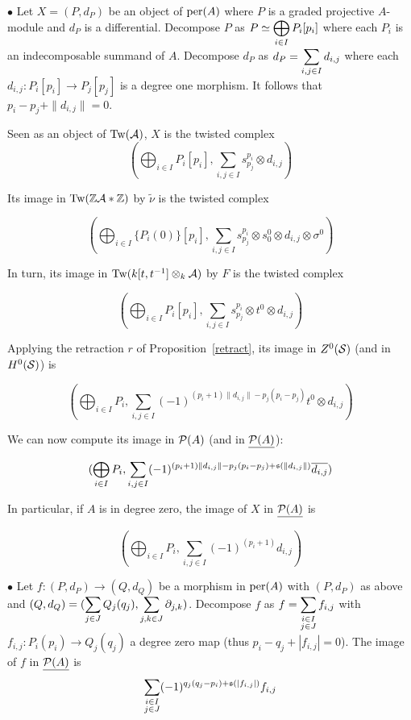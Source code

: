 \documentclass[12pt]{article}
\begin{document}
	\noindent $\bullet $ Let $X=(P,d_P)$ be an object of $\textup{per}(A)$ where $P$ is a graded projective $A$-module and $d_P$ is a differential. Decompose $P$ as $P\simeq \displaystyle\bigoplus_{i \in I} P_i[p_i]$ where each $P_i$ is an indecomposable summand of $A$. Decompose $d_P$ as $d_P= \displaystyle\sum_{i,j \in I} d_{i,j}$ where each $d_{i,j}: P_i[p_i] \to P_j[p_j]$ is a degree one morphism. It follows that $p_i-p_j + \|d_{i,j}\| = 0$.
	
	\noindent Seen as an object of $\textup{Tw}({\cal{A}})$, $X$ is the twisted complex
	\[(\bigoplus_{i \in I} P_i[p_i], \sum_{i,j \in I} s^{p_i}_{p_j} \otimes d_{i,j})\]
	
	\noindent Its image in $\textup{Tw}(\mathbb{Z} {\cal{A}} * \mathbb{Z})$ by $\tilde{\nu}$ is the twisted complex
	
	\[(\bigoplus_{i \in I} \{P_i(0)\}[p_i], \sum_{i,j \in I} s^{p_i}_{p_j} \otimes s^0_0 \otimes d_{i,j} \otimes \sigma^0)\]
	
	\noindent In turn, its image in $\textup{Tw}(k[t,t^{-1}] \otimes_k {\cal{A}})$ by $F$ is the twisted complex
	
	\[(\bigoplus_{i \in I} P_i[p_i], \sum_{i,j \in I} s^{p_i}_{p_j} \otimes t^0 \otimes d_{i,j})\]
	
	\noindent Applying the retraction $r$ of Proposition~\ref{retract}, its image in $Z^0({\cal{S}})$ (and in $H^0({\cal{S}})$) is
	
	\[(\bigoplus_{i \in I} P_i, \sum_{i,j \in I} (-1)^{(p_i+1)\|d_{i,j}\| - p_j(p_i-p_j)} t^0 \otimes d_{i,j} )\]
	
	\noindent We can now compute its image in ${\cal{P}}(A)$ (and in $\underline{{\cal{P}}(A)}$):
	
	\[(\bigoplus_{i \in I} P_i, \sum_{i,j \in I} (-1)^{(p_i+1)\|d_{i,j}\| - p_j(p_i-p_j) + \mathfrak{s}(\|d_{i,j}\|)} \overline{d_{i,j}})\]
	
	\noindent In particular, if $A$ is in degree zero, the image of $X$ in $\underline{{\cal{P}}(A)}$ is
	
	\[(\bigoplus_{i \in I} P_i, \sum_{i,j \in I} (-1)^{(p_i+1)} d_{i,j})\]
	
	\noindent $\bullet$ Let $f: (P,d_P) \to (Q,d_Q)$ be a morphism in $\textup{per}(A)$ with $(P,d_P)$ as above and $(Q,d_Q) = (\displaystyle\sum_{j \in J} Q_j(q_j), \sum_{j,k \in J} \partial_{j,k})$. Decompose $f$ as $f= \displaystyle\sum_{\substack{i \in I \\ j\in J}} f_{i,j}$ with $f_{i,j}: P_i(p_i) \to Q_j(q_j)$ a degree zero map (thus $p_i - q_j + |f_{i,j}|=0$). The image of $f$ in $\underline{{\cal{P}}(A)}$ is 
	\[\sum_{\substack{i \in I \\ j\in J}} (-1)^{q_j(q_j-p_i) + \mathfrak{s}(|f_{i,j}|)} f_{i,j}\]
	
\end{document}
